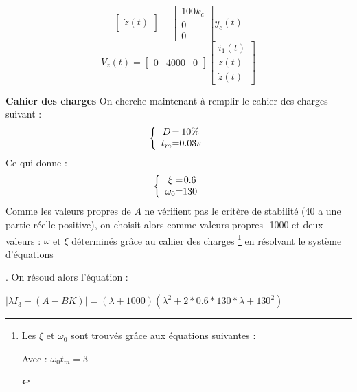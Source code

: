 {{{{\begin{center}
\[\begin{bmatrix}
        \dot{z}(t)    
    \end{bmatrix}
    +
    \begin{bmatrix}
        100k_{c} \\
        0 \\
        0
    \end{bmatrix}
    y_{c}(t)
    \] \newline
    \[
        V_{z}(t) = 
        \begin{bmatrix}
            0 & 4000 & 0
        \end{bmatrix}
        \begin{bmatrix}
            i_{1}(t) \\
            z(t) \\
            \dot{z}(t)    
        \end{bmatrix}
    \]
\end{center}
\textbf{Cahier des charges} \newline
On cherche maintenant à remplir le cahier des charges suivant :
\[
    \left \{
    \begin{array}{c @{=} c}
        D & 10\%\\
        t_{m} & 0.03s
    \end{array}
    \right.
\]
Ce qui donne :
\[
    \left \{
    \begin{array}{c @{=} c}
        \xi & 0.6\\
        \omega_{0} & 130
    \end{array}
    \right.
\]
Comme les valeurs propres de $A$ ne vérifient pas le critère de stabilité (40 a une partie réelle positive), on choisit alors comme valeurs
propres -1000 et deux valeurs : $\omega$ et $\xi$ déterminés grâce au cahier des charges 
\footnote{
    Les $\xi$ et $\omega_{0}$ sont trouvés grâce aux équations suivantes : 
    \begin{center}
    \end{center}
    \begin{center}
        Avec : \Large{$
        \omega_{0}t_{m} =  3
        $}
    \end{center}
}
en résolvant le système d'équations}
. \large{On résoud alors l'équation :}
\begin{center}
    \large{$
        |\lambda I_{3} - (A - BK)| = (\lambda + 1000)(\lambda^{2} + 2*0.6*130*\lambda + 130^{2})
    $}
\end{center}
}}}
